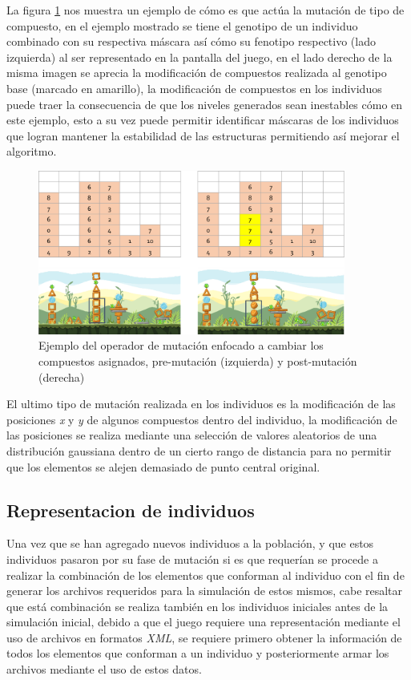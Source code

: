 La figura \ref{figure:mutate_composite} nos muestra un ejemplo de cómo es que
actúa la mutación de tipo de compuesto, en el ejemplo mostrado se tiene el
genotipo de un individuo combinado con su respectiva máscara así cómo su
fenotipo respectivo (lado izquierda) al ser representado en la pantalla del
juego, en el lado derecho de la misma imagen se aprecia la modificación de
compuestos realizada al genotipo base (marcado en amarillo), la modificación de
compuestos en los individuos puede traer la consecuencia de que los niveles
generados sean inestables cómo en este ejemplo, esto a su vez puede permitir
identificar máscaras de los individuos que logran mantener la estabilidad de las
estructuras permitiendo así mejorar el algoritmo.

\begin{figure}
  \centering
  \includegraphics[width=0.9\textwidth]{img/mutation_composite.png}
  \caption{Ejemplo del operador de mutación enfocado a cambiar los compuestos asignados, pre-mutación (izquierda) y post-mutación (derecha)}
  \label{figure:mutate_composite}
\end{figure}

El ultimo tipo de mutación realizada en los individuos es la modificación de las
posiciones \textit{x} y \textit{y} de algunos compuestos dentro del individuo,
la modificación de las posiciones se realiza mediante una selección de valores
aleatorios de una distribución gaussiana dentro de un cierto rango de distancia
para no permitir que los elementos se alejen demasiado de punto central
original.

\subsection{Representacion de individuos}
\label{section:individual_representation}

Una vez que se han agregado nuevos individuos a la población, y que estos
individuos pasaron por su fase de mutación si es que requerían se procede a
realizar la combinación de los elementos que conforman al individuo con el fin
de generar los archivos requeridos para la simulación de estos mismos, cabe
resaltar que está combinación se realiza también en los individuos iniciales
antes de la simulación inicial, debido a que el juego requiere una
representación mediante el uso de archivos en formatos \textit{XML}, se requiere
primero obtener la información de todos los elementos que conforman a un
individuo y posteriormente armar los archivos mediante el uso de estos datos.

